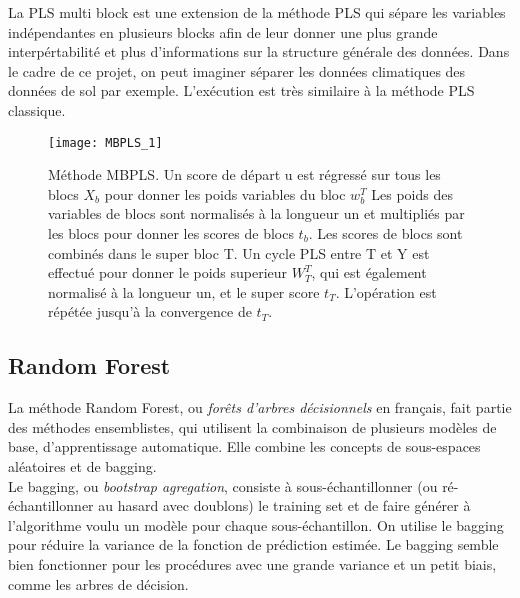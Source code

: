 

La PLS multi block est une extension de la méthode PLS qui sépare les variables indépendantes en plusieurs blocks afin de leur donner une plus grande interpértabilité et plus d'informations sur la structure générale des données. Dans le cadre de ce projet, on peut imaginer séparer les données climatiques des données de sol par exemple.  
L'exécution est très similaire à la méthode PLS classique. 

\begin{figure}[H]
	\texttt{[image: MBPLS\_1]}
	\caption{\label{MBPLSschema} Méthode MBPLS. Un score de départ u est régressé sur tous les blocs $ X_b $ pour donner les poids variables du bloc $ w^T_b $ Les poids des variables de blocs sont normalisés à la longueur un et multipliés par les blocs pour donner les scores de blocs $ t_b $.  Les scores de blocs sont combinés dans le super bloc T. Un cycle PLS entre T et Y est effectué pour donner le poids superieur $ W^T_T $, qui est également normalisé à la longueur un, et le super score $ t_T $. L'opération est répétée jusqu'à la convergence de $ t_T $. }
\end{figure}


\subsection{Random Forest}

La méthode Random Forest, ou \textit{forêts d'arbres décisionnels} en français, fait partie des méthodes ensemblistes, qui utilisent la combinaison de plusieurs modèles de base, d'apprentissage automatique. Elle combine les concepts de sous-espaces aléatoires et de bagging.\\

Le bagging, ou \textit{bootstrap agregation}, consiste à sous-échantillonner (ou ré-échantillonner au hasard avec doublons) le training set et de faire générer à l’algorithme voulu un modèle pour chaque sous-échantillon. On utilise le bagging pour réduire la variance de la fonction de prédiction estimée. Le bagging semble bien fonctionner pour les procédures avec une grande variance et un petit biais, comme les arbres de décision.\\

